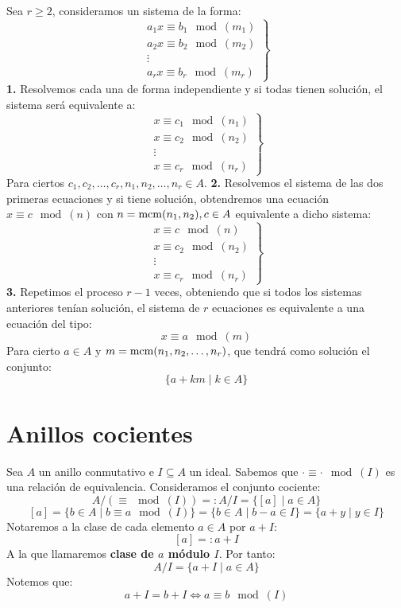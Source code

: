 Sea $r\geq 2$, consideramos un sistema de la forma:
$$\left. \begin{array}{c}
        a_1x\equiv b_1\mod(m_1) \\
        a_2x\equiv b_2\mod(m_2) \\
        \vdots                  \\
        a_rx\equiv b_r\mod(m_r)
    \end{array} \right\}$$
\textbf{1.} Resolvemos cada una de forma independiente y si todas tienen solución, el sistema será equivalente a:
$$\left. \begin{array}{c}
        x \equiv c_1\mod(n_1) \\
        x\equiv c_2\mod(n_2)  \\
        \vdots                \\
        x\equiv c_r\mod(n_r)
    \end{array} \right\}$$
Para ciertos $c_1, c_2, \ldots, c_r, n_1, n_2, \ldots, n_r \in A$.\newline
\textbf{2.} Resolvemos el sistema de las dos primeras ecuaciones y si tiene solución, obtendremos una ecuación
$x\equiv c\mod(n)$ con $n=\operatorname{mcm}(n_1,n_2),c\in A$ equivalente a dicho sistema:
$$\left. \begin{array}{c}
        x \equiv c\mod(n)    \\
        x\equiv c_2\mod(n_2) \\
        \vdots               \\
        x\equiv c_r\mod(n_r)
    \end{array} \right\}$$
\textbf{3.} Repetimos el proceso $r-1$ veces, obteniendo que si todos los sistemas anteriores tenían solución, el
sistema de $r$ ecuaciones es equivalente a una ecuación del tipo:
$$x\equiv a\mod(m)$$
Para cierto $a \in A$ y $m=\operatorname{mcm}(n_1, n_2, \ldots, n_r)$, que tendrá como solución el conjunto:
$$\{a+km \mid k \in A\}$$


\section{Anillos cocientes}

Sea $A$ un anillo conmutativo e $I \subseteq A$ un ideal.
Sabemos que $\cdot \equiv\cdot \mod(I)$ es una relación de equivalencia. Consideramos el conjunto cociente:
$$A/(\equiv\mod(I)) =: A/I = \{[a] \mid a \in A\}$$
$$[a] = \{b \in A \mid b\equiv a\mod(I)\} = \{b \in A \mid b-a \in I\} = \{a+y \mid y \in I\}$$
Notaremos a la clase de cada elemento $a \in A$ por $a+I$:
$$[a]=:a+I$$
A la que llamaremos \textbf{clase de $a$ módulo $I$}. Por tanto:
$$A/I = \{a+I \mid a \in A\}$$
Notemos que:
$$a+I = b+I \Longleftrightarrow a\equiv b\mod(I)$$

